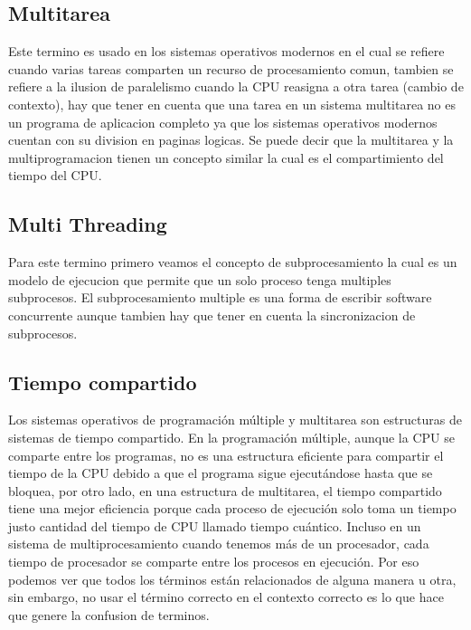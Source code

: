 \documentclass[conference,letterpaper]{IEEEtran}
\begin{document}
\subsection{Multitarea}
Este termino es usado en los sistemas operativos modernos en el cual se refiere cuando varias tareas comparten un recurso de procesamiento comun, tambien se refiere a la ilusion de paralelismo cuando la CPU reasigna a otra tarea (cambio de contexto), hay que tener en cuenta que una tarea en un sistema multitarea no es un programa de aplicacion completo ya que los sistemas operativos modernos cuentan con su division en paginas logicas. Se puede decir que la multitarea y la multiprogramacion tienen un concepto similar la cual es el compartimiento del tiempo del CPU.

\subsection{Multi Threading}
Para este termino primero veamos el concepto de subprocesamiento la cual es un modelo de ejecucion que permite que un solo proceso tenga multiples subprocesos. El subprocesamiento multiple es una forma de escribir software concurrente aunque tambien hay que tener en cuenta la sincronizacion de subprocesos.

\subsection{Tiempo compartido}
Los sistemas operativos de programación múltiple y multitarea son estructuras de sistemas de tiempo compartido. En la programación múltiple, aunque la CPU se comparte entre los programas, no es una estructura eficiente para compartir el tiempo de la CPU debido a que el programa sigue ejecutándose hasta que se bloquea, por otro lado, en una estructura de multitarea, el tiempo compartido tiene una mejor eficiencia porque cada proceso de ejecución solo toma un tiempo justo cantidad del tiempo de CPU llamado tiempo cuántico. Incluso en un sistema de multiprocesamiento cuando tenemos más de un procesador, cada tiempo de procesador se comparte entre los procesos en ejecución. Por eso podemos ver que todos los términos están relacionados de alguna manera u otra, sin embargo, no usar el término correcto en el contexto correcto es lo que hace que genere la confusion de terminos. 
\end{document}
